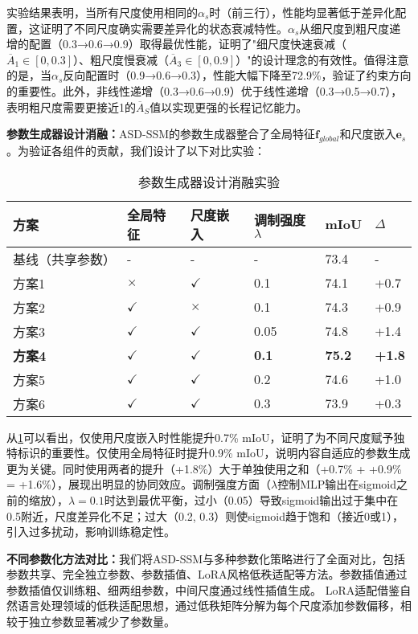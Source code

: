 \documentclass[preprint,12pt]{elsarticle}
\begin{document}
实验结果表明，当所有尺度使用相同的$\alpha_s$时（前三行），性能均显著低于差异化配置，这证明了不同尺度确实需要差异化的状态衰减特性。$\alpha_s$从细尺度到粗尺度递增的配置（0.3→0.6→0.9）取得最优性能，证明了"细尺度快速衰减（$\overline{A}_1 \in [0,0.3]$）、粗尺度慢衰减（$\overline{A}_3 \in [0,0.9]$）"的设计理念的有效性。值得注意的是，当$\alpha_s$反向配置时（0.9→0.6→0.3），性能大幅下降至72.9\%，验证了约束方向的重要性。此外，非线性递增（0.3→0.6→0.9）优于线性递增（0.3→0.5→0.7），表明粗尺度需要更接近1的$\overline{A}_S$值以实现更强的长程记忆能力。

\textbf{参数生成器设计消融：}ASD-SSM的参数生成器整合了全局特征$\mathbf{f}_{global}$和尺度嵌入$\mathbf{e}_s$。为验证各组件的贡献，我们设计了以下对比实验：

\begin{table}[htbp!]
	\centering
	\caption{参数生成器设计消融实验}
	\label{tab:paramgen_design}
	\begin{tabular}{@{}llllll@{}}
		\toprule
		方案 & 全局特征 & 尺度嵌入 & 调制强度$\lambda$ & mIoU & $\Delta$ \\ 
		\midrule
		基线（共享参数） & - & - & - & 73.4 & - \\
		\midrule
		方案1 & $\times$ & $\checkmark$ & 0.1 & 74.1 & +0.7 \\
		方案2 & $\checkmark$ & $\times$ & 0.1 & 74.3 & +0.9 \\
		方案3 & $\checkmark$ & $\checkmark$ & 0.05 & 74.8 & +1.4 \\
		\textbf{方案4} & $\checkmark$ & $\checkmark$ & \textbf{0.1} & \textbf{75.2} & \textbf{+1.8} \\
		方案5 & $\checkmark$ & $\checkmark$ & 0.2 & 74.6 & +1.0 \\
		方案6 & $\checkmark$ & $\checkmark$ & 0.3 & 73.9 & +0.3 \\
		\bottomrule
	\end{tabular}
\end{table}

从\cref{tab:paramgen_design}可以看出，仅使用尺度嵌入时性能提升0.7\% mIoU，证明了为不同尺度赋予独特标识的重要性。仅使用全局特征时提升0.9\% mIoU，说明内容自适应的参数生成更为关键。同时使用两者的提升（+1.8\%）大于单独使用之和（+0.7\% + +0.9\% = +1.6\%），展现出明显的协同效应。调制强度方面（$\lambda$控制MLP输出在sigmoid之前的缩放），$\lambda=0.1$时达到最优平衡，过小（0.05）导致sigmoid输出过于集中在0.5附近，尺度差异化不足；过大（0.2, 0.3）则使sigmoid趋于饱和（接近0或1），引入过多扰动，影响训练稳定性。

\textbf{不同参数化方法对比：}我们将ASD-SSM与多种参数化策略进行了全面对比，包括参数共享、完全独立参数、参数插值、LoRA风格低秩适配等方法。参数插值通过参数插值仅训练粗、细两组参数，中间尺度通过线性插值生成。
LoRA适配借鉴自然语言处理领域的低秩适配思想\cite{lora}，通过低秩矩阵分解为每个尺度添加参数偏移，相较于独立参数显著减少了参数量。
\end{document}
